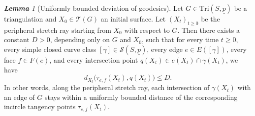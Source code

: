 \documentclass[11pt, letterpaper]{amsart}
\theoremstyle{definition}
\theoremstyle{remark}
\newtheorem{lemma}[theorem]{\rm\bf Lemma}
\newcommand{\up}{\underline{p}}
\newcommand{\Sp}{(S,\up)}
\newcommand{\TSp}{\text{Tri}\Sp}
\newcommand{\cT}{\mathcal{T}}
\newcommand{\cS}{\mathcal{S}}
\numberwithin{equation}{section}
\begin{document}
\begin{lemma}[Uniformly bounded deviation of geodesics]
\label{lm:dist-tangent-intersect}
Let \(G \in \TSp\) be a triangulation and \(X_0 \in \cT(G)\) an initial surface.
Let \((X_t)_{t \ge 0}\) be the peripheral stretch ray starting from \(X_0\) with respect to \(G\).
Then there exists a constant \(D > 0\), depending only on \(G\) and \(X_0\), such that for every time \(t \ge 0\), every simple closed curve class \([\gamma] \in \cS(S,\up)\), every edge \(e \in E([\gamma])\), every face \(f \in F(e)\), and every intersection point
\(q(X_t) \in e(X_t) \cap \gamma(X_t)\), we have
\[
  d_{X_t}\bigl(\tau_{e,f}(X_t), q(X_t)\bigr) \le D.
\]
In other words, along the peripheral stretch ray, each intersection of \(\gamma(X_t)\) with an edge of \(G\) stays within a uniformly bounded distance of the corresponding incircle tangency points \(\tau_{e,f}(X_t)\).
\end{lemma}
\end{document}
